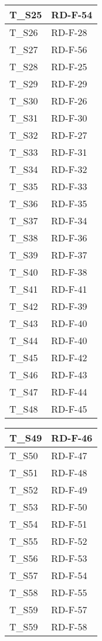 \begin{center}
\begin{tabular}{|m{6em}|m{8em}|}
        \hline
        T\_S25 & RD-F-54\\
        \hline
        T\_S26 & RD-F-28\\
        \hline
        T\_S27 & RD-F-56\\
        \hline
        T\_S28 & RD-F-25\\
        \hline
        T\_S29 & RD-F-29\\
        \hline
        T\_S30 & RD-F-26\\
        \hline
        T\_S31 & RD-F-30\\
        \hline
        T\_S32 & RD-F-27\\
        \hline
        T\_S33 & RD-F-31\\
        \hline
        T\_S34 & RD-F-32\\
        \hline
        T\_S35 & RD-F-33\\
        \hline
        T\_S36 & RD-F-35\\
        \hline
        T\_S37 & RD-F-34\\
        \hline
        T\_S38 & RD-F-36\\
        \hline
        T\_S39 & RD-F-37\\
        \hline
        T\_S40 & RD-F-38\\
        \hline
        T\_S41 & RD-F-41\\
        \hline
        T\_S42 & RD-F-39\\
        \hline
        T\_S43 & RD-F-40\\
        \hline
        T\_S44 & RD-F-40\\
        \hline
        T\_S45 & RD-F-42\\
        \hline
        T\_S46 & RD-F-43\\
        \hline
        T\_S47 & RD-F-44\\
        \hline
        T\_S48 & RD-F-45\\
        \hline
      \end{tabular}
      \newpage
      \renewcommand{\arraystretch}{1.8}
      \begin{tabular}{|m{6em}|m{8em}|}
          \hline
        T\_S49 & RD-F-46\\
        \hline
        T\_S50 & RD-F-47\\
        \hline
        T\_S51 & RD-F-48\\
        \hline
        T\_S52 & RD-F-49\\
        \hline
        T\_S53 & RD-F-50\\
        \hline
        T\_S54 & RD-F-51\\
        \hline
        T\_S55 & RD-F-52\\
        \hline
        T\_S56 & RD-F-53\\
        \hline
        T\_S57 & RD-F-54\\
        \hline
        T\_S58 & RD-F-55\\
        \hline
        T\_S59 & RD-F-57\\
        \hline
        T\_S59 & RD-F-58\\
        \hline
    \end{tabular}
\end{center}